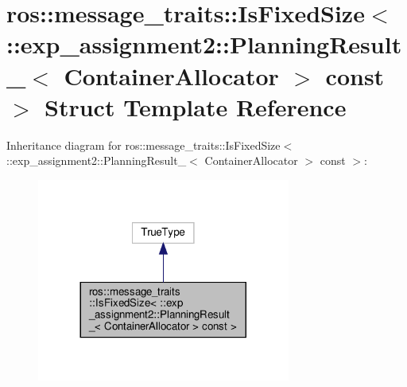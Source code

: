 \hypertarget{structros_1_1message__traits_1_1IsFixedSize_3_01_1_1exp__assignment2_1_1PlanningResult___3_01Con0c207ecd7b90f2b0c0beabd5efbc7d76}{}\section{ros\+:\+:message\+\_\+traits\+:\+:Is\+Fixed\+Size$<$ \+:\+:exp\+\_\+assignment2\+:\+:Planning\+Result\+\_\+$<$ Container\+Allocator $>$ const $>$ Struct Template Reference}
\label{structros_1_1message__traits_1_1IsFixedSize_3_01_1_1exp__assignment2_1_1PlanningResult___3_01Con0c207ecd7b90f2b0c0beabd5efbc7d76}


Inheritance diagram for ros\+:\+:message\+\_\+traits\+:\+:Is\+Fixed\+Size$<$ \+:\+:exp\+\_\+assignment2\+:\+:Planning\+Result\+\_\+$<$ Container\+Allocator $>$ const $>$\+:
\nopagebreak
\begin{figure}[H]
\begin{center}
\leavevmode
\includegraphics[width=236pt]{structros_1_1message__traits_1_1IsFixedSize_3_01_1_1exp__assignment2_1_1PlanningResult___3_01Con38e1c82c6eee831a27e4b19e120a9fd4}
\end{center}
\end{figure}


